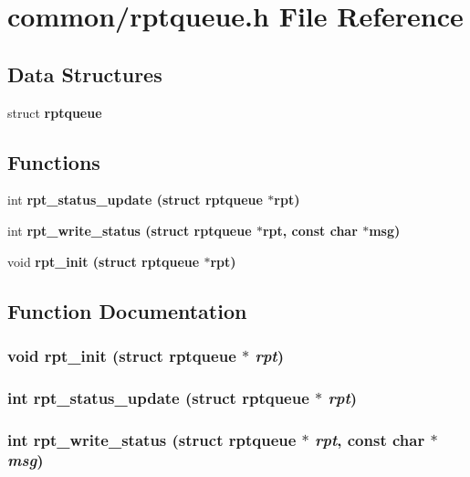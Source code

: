 \section{common/rptqueue.h File Reference}
\label{rptqueue_8h}
\subsection*{Data Structures}
\begin{CompactItemize}
\item 
struct \bf{rptqueue}
\end{CompactItemize}
\subsection*{Functions}
\begin{CompactItemize}
\item 
int \bf{rpt\_\-status\_\-update} (struct \bf{rptqueue} $\ast$rpt)
\item 
int \bf{rpt\_\-write\_\-status} (struct \bf{rptqueue} $\ast$rpt, const char $\ast$msg)
\item 
void \bf{rpt\_\-init} (struct \bf{rptqueue} $\ast$rpt)
\end{CompactItemize}


\subsection{Function Documentation}
\subsubsection{\setlength{\rightskip}{0pt plus 5cm}void rpt\_\-init (struct \bf{rptqueue} $\ast$ {\em rpt})}\label{rptqueue_8h_d35c548a217774330d91baeed46a3606}


\subsubsection{\setlength{\rightskip}{0pt plus 5cm}int rpt\_\-status\_\-update (struct \bf{rptqueue} $\ast$ {\em rpt})}\label{rptqueue_8h_cc96d7628571abc803f655bf97a1020b}


\subsubsection{\setlength{\rightskip}{0pt plus 5cm}int rpt\_\-write\_\-status (struct \bf{rptqueue} $\ast$ {\em rpt}, const char $\ast$ {\em msg})}\label{rptqueue_8h_9acf785ecd74f52b16096a301dec2906}


